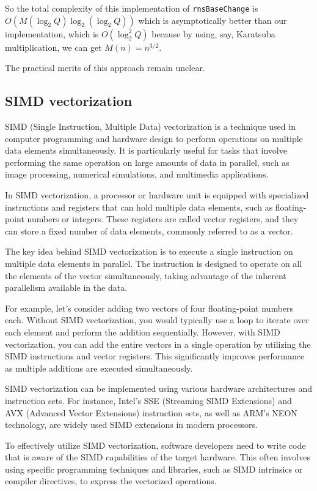 So the total complexity of this implementation of \verb!rnsBaseChange! is
$O(M(\log_2Q)\log_2(\log_2Q))$ which is asymptotically better than our
implementation, which is $O(\log_2^2Q)$ because by using, say, Karatsuba
multiplication, we can get $M(n) = n^{3/2}$.

The practical merits of this approach remain unclear.

\subsection{SIMD vectorization}

SIMD (Single Instruction, Multiple Data) vectorization is a technique used in
computer programming and hardware design to perform operations on multiple data
elements simultaneously. It is particularly useful for tasks that involve
performing the same operation on large amounts of data in parallel, such as
image processing, numerical simulations, and multimedia applications.

In SIMD vectorization, a processor or hardware unit is equipped with
specialized instructions and registers that can hold multiple data elements,
such as floating-point numbers or integers. These registers are called vector
registers, and they can store a fixed number of data elements, commonly
referred to as a vector.

The key idea behind SIMD vectorization is to execute a single instruction on
multiple data elements in parallel. The instruction is designed to operate on
all the elements of the vector simultaneously, taking advantage of the inherent
parallelism available in the data.

For example, let's consider adding two vectors of four floating-point numbers
each. Without SIMD vectorization, you would typically use a loop to iterate
over each element and perform the addition sequentially. However, with SIMD
vectorization, you can add the entire vectors in a single operation by
utilizing the SIMD instructions and vector registers. This significantly
improves performance as multiple additions are executed simultaneously.

SIMD vectorization can be implemented using various hardware architectures and
instruction sets. For instance, Intel's SSE (Streaming SIMD Extensions) and AVX
(Advanced Vector Extensions) instruction sets, as well as ARM's NEON
technology, are widely used SIMD extensions in modern processors.

To effectively utilize SIMD vectorization, software developers need to write
code that is aware of the SIMD capabilities of the target hardware. This often
involves using specific programming techniques and libraries, such as SIMD
intrinsics or compiler directives, to express the vectorized operations.

